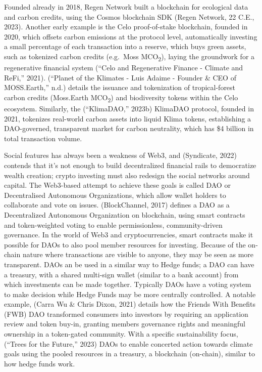 \documentclass[
  12pt,
  letterpaper,
  DIV=11,
  numbers=noendperiod]{scrartcl}
\begin{document}
Founded already in 2018, Regen Network built a blockchain for ecological
data and carbon credits, using the Cosmos blockchain SDK (Regen Network,
22 C.E., 2023). Another early example is the Celo proof-of-stake
blockchain, founded in 2020, which offsets carbon emissions at the
protocol level, automatically investing a small percentage of each
transaction into a reserve, which buys green assets, such as tokenized
carbon credits (e.g.~Moss MCO\textsubscript{2}), laying the groundwork
for a regenerative financial system ({``Celo and {Regenerative Finance}
- {Climate} and {ReFi},''} 2021). ({``Planet of the {Klimates} - {Luis
Adaime} - {Founder} \& {CEO} of {MOSS}.{Earth},''} n.d.) details the
issuance and tokenization of tropical-forest carbon credits (Moss.Earth
MCO\textsubscript{2}) and biodiversity tokens within the Celo ecosystem.
Similarly, the ({``{KlimaDAO},''} 2023b) KlimaDAO protocol, founded in
2021, tokenizes real-world carbon assets into liquid Klima tokens,
establishing a DAO-governed, transparent market for carbon neutrality,
which has \$4 billion in total transaction volume.

Social features has always been a weakness of Web3, and (Syndicate,
2022) contends that it's not enough to build decentralized financial
rails to democratize wealth creation; crypto investing must also
redesign the social networks around capital. The Web3-based attempt to
achieve these goals is called DAO or Decentralised Autonomous
Organizations, which allow wallet holders to collaborate and vote on
issues. (BlockChannel, 2017) defines a DAO as a Decentralized Autonomous
Organization on blockchain, using smart contracts and token-weighted
voting to enable permissionless, community-driven governance. In the
world of Web3 and cryptocurrencies, smart contracts make it possible for
DAOs to also pool member resources for investing. Because of the
on-chain nature where transactions are visible to anyone, they may be
seen as more transparent. DAOs an be used in a similar way to Hedge
funds; a DAO can have a treasury, with a shared multi-sign wallet
(similar to a bank account) from which investments can be made together.
Typically DAOs have a voting system to make decision while Hedge Funds
may be more centrally controlled. A notable example, (Carra Wu \& Chris
Dixon, 2021) details how the Friends With Benefits (FWB) DAO transformed
consumers into investors by requiring an application review and token
buy-in, granting members governance rights and meaningful ownership in a
token-gated community. With a specific sustainability focus, ({``Trees
for the {Future},''} 2023) DAOs to enable concerted action towards
climate goals using the pooled resources in a treasury, a blockchain
(on-chain), similar to how hedge funds work.
\end{document}
